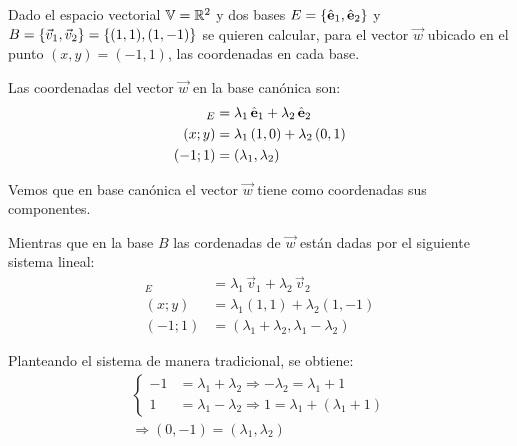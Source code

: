 \begin{mdframed}[style=ExampleFrame]
    \begin{example}
    \end{example}
    Dado el espacio vectorial $\mathbb{V}=\mathbb{R}^2$ y dos bases $E={ \left\{ {\hat{\textbf{e}}_1,\hat{\textbf{e}}_2} \right\} }$ y $B={ \left\{ {\Vec{v}_1,\Vec{v}_2} \right\} }={ \left\{ {(1,1),(1,-1)} \right\} }$ se quieren calcular, para el vector $\Vec{w}$ ubicado en el punto $(x,y)=(-1,1)$, las coordenadas en cada base.
    
    \begin{center}
        \def\svgwidth{0.6\linewidth}
        
    \end{center}
    
    Las coordenadas del vector $\Vec{w}$ en la base canónica son:
    \begin{align*}
        [\Vec{w}]_E &= \lambda_1 \, \eVer_1 + \lambda_2 \, \eVer_2
        \\
        (x;y) &= \lambda_1 \left(1,0\right) + \lambda_2 \left(0,1\right)
        \\
        (-1;1) &= (\lambda_1,\lambda_2)
    \end{align*}
    
    Vemos que en base canónica el vector $\Vec{w}$ tiene como coordenadas sus componentes.
    
    Mientras que en la base $B$ las cordenadas de $\Vec{w}$ están dadas por el siguiente sistema lineal:
    \begin{align*}
        [\Vec{w}]_E &= \lambda_1 \, \Vec{v}_1 + \lambda_2 \, \Vec{v}_2
        \\
        (x;y) &= \lambda_1 \left(1,1\right) + \lambda_2 \left(1,-1\right)
        \\
        (-1;1) &= (\lambda_1+\lambda_2,\lambda_1-\lambda_2)
    \end{align*}
    
    Planteando el sistema de manera tradicional, se obtiene:
    \begin{gather*}
        \left\{
        \begin{aligned}
            -1 &= \lambda_1+\lambda_2 \Rightarrow -\lambda_2=\lambda_1+1 
            \\
            1 &= \lambda_1-\lambda_2 \Rightarrow 1=\lambda_1+(\lambda_1+1)
        \end{aligned}
        \right.
        \\
        \Rightarrow (0,-1) = (\lambda_1,\lambda_2)
    \end{gather*}
    

\end{mdframed}
